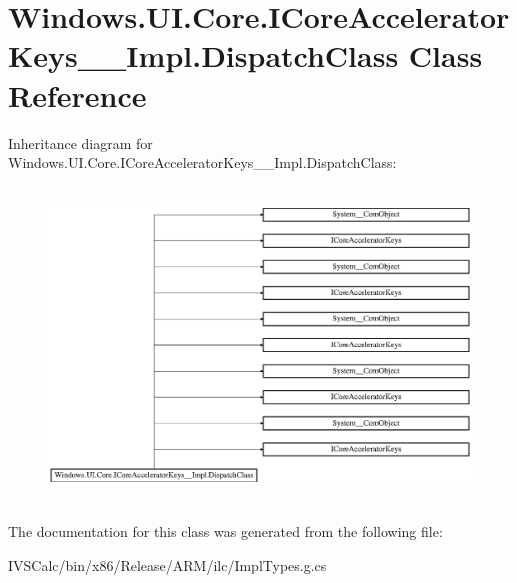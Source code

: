 \hypertarget{class_windows_1_1_u_i_1_1_core_1_1_i_core_accelerator_keys_____impl_1_1_dispatch_class}{}\section{Windows.\+U\+I.\+Core.\+I\+Core\+Accelerator\+Keys\+\_\+\+\_\+\+Impl.\+Dispatch\+Class Class Reference}
\label{class_windows_1_1_u_i_1_1_core_1_1_i_core_accelerator_keys_____impl_1_1_dispatch_class}
Inheritance diagram for Windows.\+U\+I.\+Core.\+I\+Core\+Accelerator\+Keys\+\_\+\+\_\+\+Impl.\+Dispatch\+Class\+:\begin{figure}[H]
\begin{center}
\leavevmode
\includegraphics[height=8.392370cm]{class_windows_1_1_u_i_1_1_core_1_1_i_core_accelerator_keys_____impl_1_1_dispatch_class}
\end{center}
\end{figure}


The documentation for this class was generated from the following file\+:\begin{DoxyCompactItemize}
\item 
I\+V\+S\+Calc/bin/x86/\+Release/\+A\+R\+M/ilc/Impl\+Types.\+g.\+cs\end{DoxyCompactItemize}
